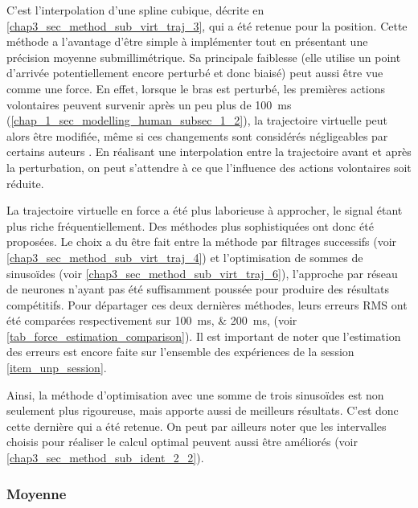 C'est l'interpolation d'une spline cubique, décrite en \cref{chap3_sec_method_sub_virt_traj_3}, qui a été retenue pour la position. Cette méthode a l'avantage d'être simple à implémenter tout en présentant une précision moyenne submillimétrique. Sa principale faiblesse (elle utilise un point d'arrivée potentiellement encore perturbé et donc biaisé) peut aussi être vue comme une force. En effet, lorsque le bras est perturbé, les premières actions volontaires peuvent survenir après un peu plus de \SI{100}{\milli\second} (\cref{chap_1_sec_modelling_human_subsec_1_2}), la trajectoire virtuelle peut alors être modifiée, même si ces changements sont considérés négligeables par certains auteurs \parencite{erden_hand_2015}. En réalisant une interpolation entre la trajectoire avant et après la perturbation, on peut s'attendre à ce que l'influence des actions volontaires soit réduite.

La trajectoire virtuelle en force a été plus laborieuse à approcher, le signal étant plus riche fréquentiellement. Des méthodes plus sophistiquées ont donc été proposées. Le choix a du être fait entre la méthode par filtrages successifs (voir \cref{chap3_sec_method_sub_virt_traj_4}) et l'optimisation de sommes de sinusoïdes (voir \cref{chap3_sec_method_sub_virt_traj_6}), l'approche par réseau de neurones n'ayant pas été suffisamment poussée pour produire des résultats compétitifs. Pour départager ces deux dernières méthodes, leurs erreurs RMS ont été comparées respectivement sur \SIlist{100;200}{\milli\second}, (voir \cref{tab_force_estimation_comparison}). Il est important de noter que l'estimation des erreurs est encore faite sur l'ensemble des expériences de la session \cref{item_unp_session}. 

Ainsi, la méthode d'optimisation avec une somme de trois sinusoïdes est non seulement plus rigoureuse, mais apporte aussi de meilleurs résultats. C'est donc cette dernière qui a été retenue. On peut par ailleurs noter que les intervalles choisis pour réaliser le calcul optimal peuvent aussi être améliorés (voir \cref{chap3_sec_method_sub_ident_2_2}).

\subsubsection{Moyenne} \label{chap3_sec_method_sub_virt_traj_1}

